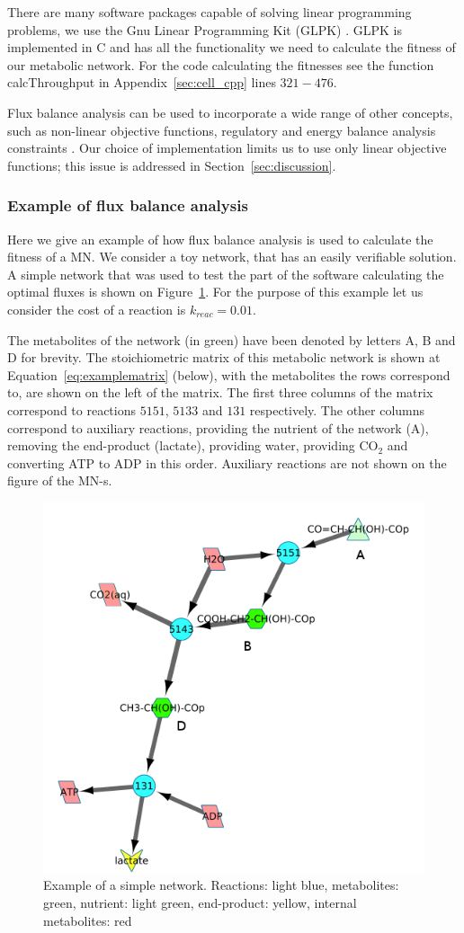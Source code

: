 \documentclass[a4paper,12pt]{article}
\begin{document}
	
	There are many software packages capable of solving linear programming problems, we use the Gnu Linear Programming Kit (GLPK) \cite{glpk}. GLPK is implemented in C and has all the functionality we need to calculate the fitness of our metabolic network. For the code calculating the fitnesses see the function calcThroughput in Appendix~\ref{sec:cell_cpp} lines $321-476$.

	Flux balance analysis can be used to incorporate a wide range of other concepts, such as non-linear objective functions, regulatory and energy balance analysis constraints \cite{fbaconstraints}. Our choice of implementation limits us to use only linear objective functions; this issue is addressed in Section~\ref{sec:discussion}.

\subsubsection{Example of flux balance analysis}
\label{sub:example_of_flux_balance_analysis}

Here we give an example of how flux balance analysis is used to calculate the fitness of a MN. We consider a toy network, that has an easily verifiable solution. A simple network that was used to test the part of the software calculating the optimal fluxes is shown on Figure~\ref{fig:examplenetwork}. For the purpose of this example let us consider the cost of a reaction is $k_{reac}=0.01$.


	The metabolites of the network (in green) have been denoted by letters A, B and D for brevity. The stoichiometric matrix of this metabolic network is shown at Equation~\ref{eq:examplematrix} (below), with the metabolites the rows correspond to, are shown on the left of the matrix. The first three columns of the matrix correspond to reactions $5151$, $5133$ and $131$ respectively. The other columns correspond to auxiliary reactions, providing the nutrient of the network (A), removing the end-product (lactate), providing water, providing CO$_2$ and converting ATP to ADP in this order. Auxiliary reactions are not shown on the figure of the MN-s. 

\begin{figure}[htbp]
	\centering
	\includegraphics[width=0.5\linewidth]{initial_network_ABC.png}
	\caption{Example of a simple network. Reactions: light blue, metabolites: green, nutrient: light green, end-product: yellow, internal metabolites: red}
	\label{fig:examplenetwork}
\end{figure}
\end{document}
